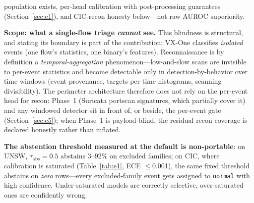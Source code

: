 \documentclass[sigconf,anonymous=false]{acmart}
\begin{document}
population exists, per-head calibration with post-processing guarantees (Section~\ref{sec:e1}), and CIC-recon honesty below---not raw AUROC superiority.

\textbf{Scope: what a single-flow triage \emph{cannot} see.} This blindness is structural, and stating its boundary is part of the contribution: VX-One classifies \emph{isolated} events (one flow's statistics, one binary's features). Reconnaissance is by definition a \emph{temporal-aggregation} phenomenon---low-and-slow scans are invisible to per-event statistics and become detectable only in detection-by-behavior over time windows (event provenance, targets-per-time histograms, scanning divisibility). The perimeter architecture therefore does not rely on the per-event head for recon: Phase~1 (Suricata portscan signatures, which partially cover it) and any windowed detector sit in front of, or beside, the per-event gate (Section~\ref{sec:e5}); when Phase~1 is payload-blind, the residual recon coverage is declared honestly rather than inflated.

\textbf{The abstention threshold measured at the default is non-portable}: on UNSW, $\tau_{\mathrm{abs}}=0.5$ abstains 3--92\% on excluded families; on CIC, where calibration is saturated (Table~\ref{tab:e1}, ECE $\le$0.001), the same fixed threshold abstains on \emph{zero} rows---every excluded-family event gets assigned to \texttt{normal} with high confidence. Under-saturated models are correctly selective, over-saturated ones are confidently wrong.
\end{document}
